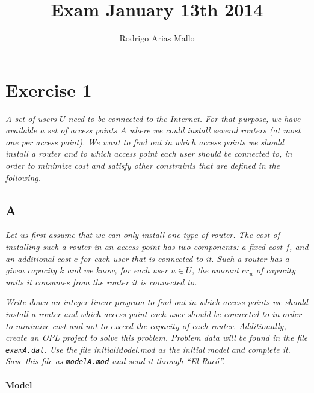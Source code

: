 \documentclass[11pt,a4paper]{article}
\title{Exam January 13th 2014}
\author{Rodrigo Arias Mallo}
\begin{document}
\maketitle

\section*{Exercise 1}

{\sl A set of users $U$ need to be connected to the Internet. For that purpose, 
we have available a set of access points $A$ where we could install several 
routers (at most one per access point). We want to find out in which access 
points we should install a router and to which access point each user should be 
connected to, in order to minimize cost and satisfy other constraints that are 
defined in the following.}

\subsection*{A}

\textsl{Let us first assume that we can only install one type of router. The 
cost of installing such a router in an access point has two components: a fixed 
cost $f$, and an additional cost $c$ for each user that is connected to it. Such 
a router has a given capacity $k$ and we know, for each user $u \in U$, the 
amount $cr_u$ of capacity units it consumes from the router it is connected to.}

\textsl{Write down an integer linear program to find out in which access points 
we should install a router and which access point each user should be connected 
to in order to minimize cost and not to exceed the capacity of each router.  
Additionally, create an OPL project to solve this problem. Problem data will be 
found in the file \texttt{examA.dat}. Use the file initialModel.mod as the 
initial model and complete it.  Save this file as \texttt{modelA.mod} and send 
it through ``El Racó''.}

\paragraph*{Model}
\end{document}
